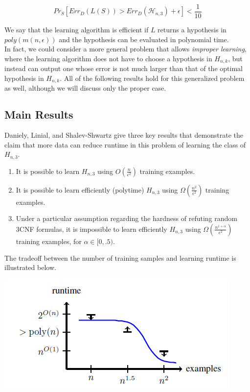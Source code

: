 \documentclass[11pt,a4paper]{article}
\begin{document}
$$ Pr_{S}[ Err_D(L(S)) > Err_D(\mathcal{H}_{n,3}) + \epsilon ] < \frac{1}{10}$$

We say that the learning algorithm is efficient if $L$ returns a hypothesis in $poly(m(n, \epsilon) )$ and the hypothesis can be evaluated in polynomial time.\\

In fact, we could consider a more general problem that allows \textit{improper learning}, where the learning algorithm does not have to choose a hypothesis in $H_{n, k}$, but instead can output one whose error is not much larger than that of the optimal hypothesis in $H_{n, k}$. All of the following results hold for this generalized problem as well, although we will discuss only the proper case.

\subsection{Main Results}

Daniely, Linial, and Shalev-Shwartz give three key results that demonstrate the claim that more data can reduce runtime in this problem of learning the class of $H_{n, 3}$.

\begin{enumerate}

\item It is possible to learn $H_{n, 3}$ using $O(\frac{n}{\epsilon^2})$ training examples.
\item It is possible to learn efficiently (polytime) $H_{n, 3}$ using $\Omega(\frac{n^2}{\epsilon^2})$ training examples.
\item Under a particular assumption regarding the hardness of refuting random 3CNF formulas, it is impossible to learn efficiently $H_{n, 3}$ using $\Omega(\frac{n^{1 + \alpha}}{\epsilon^2})$ training examples, for $\alpha \in [0, .5)$.

\end{enumerate}

The tradeoff between the number of training samples and learning runtime is illustrated below.

\includegraphics[scale=1]{tradeoff_graph}
\end{document}
